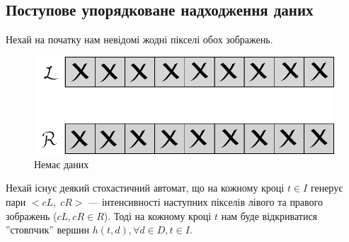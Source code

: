 \subsection{Поступове упорядковане надходження даних}
Нехай на початку нам невідомі жодні пікселі обох зображень. 
\begin{figure}[h!]
	\centering
	\includegraphics[scale = 0.8]{allclosed2.pdf}
	\caption{Немає даних}
	\label{2.1nodata}
\end{figure}
Нехай існує деякий стохастичний автомат, що на кожному кроці $ t \in I $ генерує пари $<cL, \;cR>$ --- інтенсивності наступних пікселів лівого та правого зображень ($ cL, cR \in R $).
Тоді на кожному кроці $ t $ нам буде відкриватися ''стовпчик'' вершин $  h(t, d), \forall d \in D, t \in I. $
